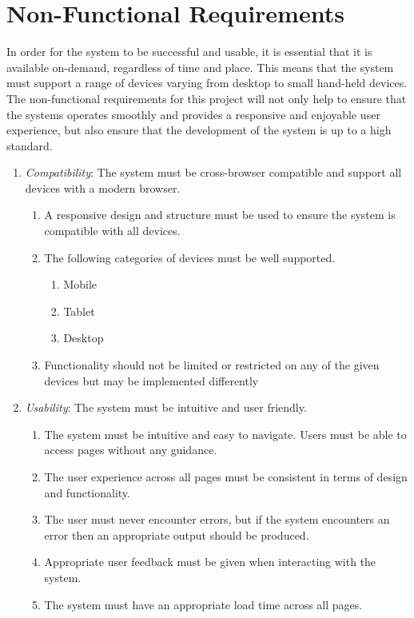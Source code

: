 \section{Non-Functional Requirements}
In order for the system to be successful and usable, it is essential that it is available on-demand, regardless of time and place. This means that the system must support a range of devices varying from desktop to small hand-held devices. The non-functional requirements for this project will not only help to ensure that the systems operates smoothly and provides a responsive and enjoyable user experience, but also ensure that the development of the system is up to a high standard.
\begin{enumerate}[label=\textbf{NF\arabic*}]
	\item \textit{Compatibility}: The system must be cross-browser compatible and support all devices with a modern browser.
		\begin{enumerate}
			\item A responsive design and structure must be used to ensure the system is compatible with all devices.
			\item The following categories of devices must be well supported.
			\begin{enumerate}
				\item Mobile
				\item Tablet
				\item Desktop
			\end{enumerate}
			\item Functionality should not be limited or restricted on any of the given devices but may be implemented differently
		\end{enumerate}
	\item \textit{Usability}: The system must be intuitive and user friendly.
		\begin{enumerate}
			\item The system must be intuitive and easy to navigate. Users must be able to access pages without any guidance.
			\item The user experience across all pages must be consistent in terms of design and functionality.
			\item The user must never encounter errors, but if the system encounters an error then an appropriate output should be produced.
			\item Appropriate user feedback must be given when interacting with the system.
			\item The system must have an appropriate load time across all pages.

\end{enumerate}
\end{enumerate}
